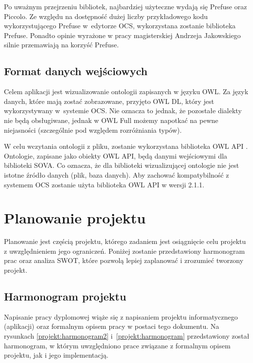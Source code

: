 Po uważnym przejrzeniu bibliotek, najbardziej użyteczne wydają się Prefuse oraz Piccolo. Ze względu na dostępność dużej liczby przykładowego kodu wykorzystującego Prefuse 
w~edytorze OCS, wykorzystana zostanie biblioteka Prefuse. Ponadto opinie wyrażone w pracy magisterskiej Andrzeja Jakowskiego\cite{jankowski} silnie przemawiają 
na korzyść Prefuse.


\subsection{Format danych wejściowych}
Celem aplikacji jest wizualizowanie ontologii zapisanych w języku OWL. Za język danych, które mają zostać zobrazowane, przyjęto OWL DL, który jest wykorzystywany w~systemie OCS. 
 Nie oznacza to jednak, że pozostałe dialekty nie będą obsługiwane, jednak w OWL Full możemy napotkać na pewne niejasności (szczególnie pod względem rozróżniania typów).
\par 
W celu wczytania ontologii z pliku, zostanie wykorzystana biblioteka OWL API \cite{owlapi,owlapi1}. Ontologie, zapisane jako obiekty OWL API, będą danymi wejściowymi dla biblioteki SOVA. 
Co oznacza, że dla biblioteki wizualizującej ontologie nie jest istotne źródło danych (plik, baza danych). Aby zachować kompatybilność z systemem OCS zostanie użyta biblioteka 
OWL API w wersji 2.1.1. 

\section{Planowanie projektu}
Planowanie jest częścią projektu, którego zadaniem jest osiągnięcie celu projektu z uwzględnieniem jego ograniczeń. Poniżej zostanie przedstawiony harmonogram prac oraz
 analiza SWOT, które pozwolą lepiej zaplanować i zrozumieć tworzony projekt.

\subsection{Harmonogram projektu}
Napisanie pracy dyplomowej wiąże się z napisaniem projektu informatycznego (aplikacji) oraz formalnym opisem pracy w postaci tego dokumentu. 
Na rysunkach \ref{projekt:harmonogram2} i~\ref{projekt:harmonogram}  przedstawiony został harmonogram, w którym uwzględniono prace związane z formalnym opisem projektu,
 jak i jego implementacją. 




